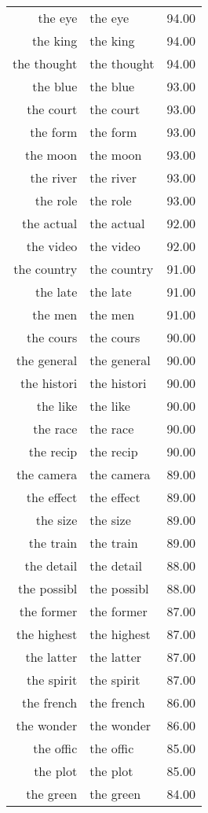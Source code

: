 \begin{table}[ht]
\begin{tabular}{rlr}
  the eye & the eye & 94.00 \\ 
  the king & the king & 94.00 \\ 
  the thought & the thought & 94.00 \\ 
  the blue & the blue & 93.00 \\ 
  the court & the court & 93.00 \\ 
  the form & the form & 93.00 \\ 
  the moon & the moon & 93.00 \\ 
  the river & the river & 93.00 \\ 
  the role & the role & 93.00 \\ 
  the actual & the actual & 92.00 \\ 
  the video & the video & 92.00 \\ 
  the country & the country & 91.00 \\ 
  the late & the late & 91.00 \\ 
  the men & the men & 91.00 \\ 
  the cours & the cours & 90.00 \\ 
  the general & the general & 90.00 \\ 
  the histori & the histori & 90.00 \\ 
  the like & the like & 90.00 \\ 
  the race & the race & 90.00 \\ 
  the recip & the recip & 90.00 \\ 
  the camera & the camera & 89.00 \\ 
  the effect & the effect & 89.00 \\ 
  the size & the size & 89.00 \\ 
  the train & the train & 89.00 \\ 
  the detail & the detail & 88.00 \\ 
  the possibl & the possibl & 88.00 \\ 
  the former & the former & 87.00 \\ 
  the highest & the highest & 87.00 \\ 
  the latter & the latter & 87.00 \\ 
  the spirit & the spirit & 87.00 \\ 
  the french & the french & 86.00 \\ 
  the wonder & the wonder & 86.00 \\ 
  the offic & the offic & 85.00 \\ 
  the plot & the plot & 85.00 \\ 
  the green & the green & 84.00 \\ 

\end{tabular}
\end{table}
